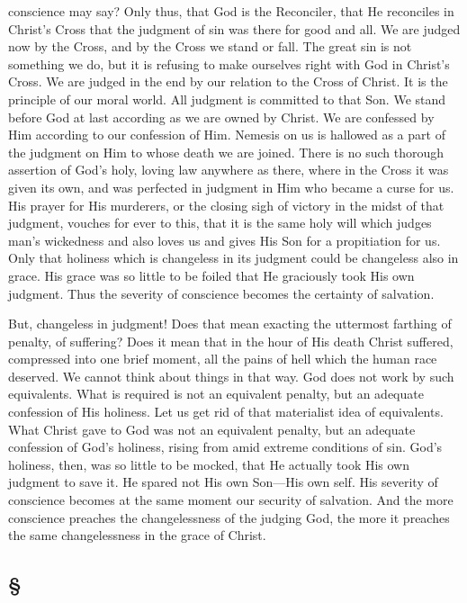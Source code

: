 \documentclass[draft]{ptfdoc}
\begin{document}
conscience may say? Only thus, that God is the 
Reconciler, that He reconciles in Christ's Cross 
that the judgment of sin was there for good and 
all. We are judged now by the Cross, and by 
the Cross we stand or fall. The great sin is not 
something we do, but it is refusing to make ourselves 
right with God in Christ's Cross. We are 
judged in the end by our relation to the Cross of 
Christ. It is the principle of our moral world. 
All judgment is committed to that Son. We 
stand before God at last according as we are 
owned by Christ. We are confessed by Him 
according to our confession of Him. Nemesis 
on us is hallowed as a part of the judgment 
on Him to whose death we are joined. There is 
no such thorough assertion of God's holy, loving 
law anywhere as there, where in the Cross it 
was given its own, and was perfected in judgment 
in Him who became a curse for us. His 
prayer for His murderers, or the closing sigh of 
victory in the midst of that judgment, vouches 
for ever to this, that it is the same holy will 
which judges man's wickedness and also loves us 
and gives His Son for a propitiation for us. 
Only that holiness which is changeless in its 
judgment could be changeless also in grace. 
His grace was so little to be foiled that He 
graciously took His own judgment. Thus the 
severity of conscience becomes the certainty of 
salvation. 


But, changeless in judgment! Does that mean 
exacting the uttermost farthing of penalty, of 
suffering? Does it mean that in the hour of 
His death Christ suffered, compressed into one 
brief moment, all the pains of hell which the 
human race deserved. We cannot think about 
things in that way. God does not work by such 
equivalents. What is required is not an equivalent 
penalty, but an adequate confession of His 
holiness. Let us get rid of that materialist 
idea of equivalents. What Christ gave to God 
was not an equivalent penalty, but an adequate 
confession of God's holiness, rising from amid 
extreme conditions of sin. God's holiness, then, 
was so little to be mocked, that He actually 
took His own judgment to save it. He spared 
not His own Son---His own self. His severity 
of conscience becomes at the same moment our 
security of salvation. And the more conscience 
preaches the changelessness of the judging God, 
the more it preaches the same changelessness in 
the grace of Christ. 

\subsection*{
\S
}
\end{document}
